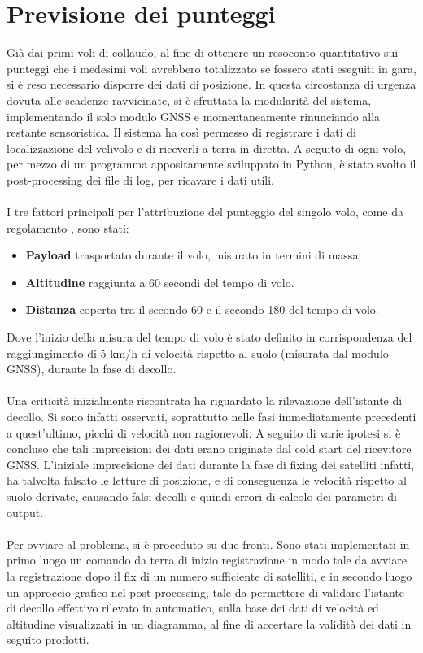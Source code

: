 \documentclass[12pt]{article}
\begin{document}
\section{Previsione dei punteggi}
Già dai primi voli di collaudo, al fine di ottenere un resoconto quantitativo sui punteggi che i medesimi voli avrebbero totalizzato se fossero stati eseguiti in gara, si è reso necessario disporre dei dati di posizione. In questa circostanza di urgenza dovuta alle scadenze ravvicinate, si è sfruttata la modularità del sistema, implementando il solo modulo GNSS e momentaneamente rinunciando alla restante sensoristica. Il sistema ha così permesso di registrare i dati di localizzazione del velivolo e di riceverli a terra in diretta. A seguito di ogni volo, per mezzo di un programma appositamente sviluppato in Python, è stato svolto il post-processing dei file di log, per ricavare i dati utili.
\\\\
I tre fattori principali per l'attribuzione del punteggio del singolo volo, come da regolamento \cite{regulation}, sono stati:
\begin{itemize}
\item \textbf{Payload} trasportato durante il volo, misurato in termini di massa.
\item \textbf{Altitudine} raggiunta a 60 secondi del tempo di volo.
\item \textbf{Distanza} coperta tra il secondo 60 e il secondo 180 del tempo di volo.
\end{itemize}
Dove l'inizio della misura del tempo di volo è stato definito in corrispondenza del raggiungimento di 5 km/h di velocità rispetto al suolo (misurata dal modulo GNSS), durante la fase di decollo.
\\\\
Una criticità inizialmente riscontrata ha riguardato la rilevazione dell'istante di decollo. Si sono infatti osservati, soprattutto nelle fasi immediatamente precedenti a quest'ultimo, picchi di velocità non ragionevoli. A seguito di varie ipotesi si è concluso che tali imprecisioni dei dati erano originate dal cold start del ricevitore GNSS. L'iniziale imprecisione dei dati durante la fase di fixing dei satelliti infatti, ha talvolta falsato le letture di posizione, e di conseguenza le velocità rispetto al suolo derivate, causando falsi decolli e quindi errori di calcolo dei parametri di output. 
\\\\
Per ovviare al problema, si è proceduto su due fronti. Sono stati implementati in primo luogo un comando da terra di inizio registrazione in modo tale da avviare la registrazione dopo il fix di un numero sufficiente di satelliti, e in secondo luogo un approccio grafico nel post-processing, tale da permettere di validare l'istante di decollo effettivo rilevato in automatico, sulla base dei dati di velocità ed altitudine visualizzati in un diagramma, al fine di accertare la validità dei dati in seguito prodotti. 
\end{document}
